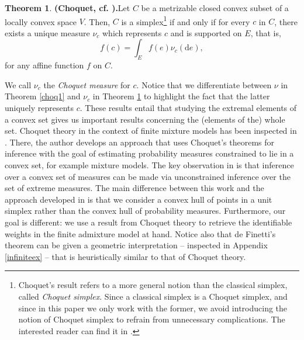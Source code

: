 \documentclass[12pt, reqno]{amsart}
\theoremstyle{definition}
\newtheorem{theorem}{Theorem}%
\begin{document}

\begin{theorem}{\textbf{(Choquet, cf. \cite[Theorem, page 60]{phelps1}).}}\label{choq2}
Let $C$ be a metrizable closed convex subset of a locally convex space $V$. Then, $C$ is a simplex\footnote{Choquet's result refers to a more general notion than the classical simplex, called {\em Choquet simplex}. Since a classical simplex is a Choquet simplex, and since in this paper we only work with the former, we avoid introducing the notion of Choquet simplex to refrain from unnecessary complications. The interested reader can find it in \cite[Chapter 10, page 52]{phelps}.} if and only if for every $c$ in $C$, there exists a unique measure $\nu_c$ which represents $c$ and is supported on $E$, that is, 
$$f(c)=\int_E f(e) \nu_c(\text{d}e),$$
for any affine function $f$ on $C$.
\end{theorem}

We call $\nu_c$ the \textit{Choquet measure} for $c$. Notice that we differentiate between $\nu$ in Theorem \ref{choq1} and $\nu_c$ in Theorem \ref{choq2} to highlight the fact that the latter uniquely represents $c$. These results entail that studying the extremal elements of a convex set gives us important results concerning the (elements of the) whole set. Choquet theory in the context of finite mixture models has been inspected in \cite{hoff}. There, the author develops an approach that uses Choquet's theorems for inference with the goal of estimating probability measures constrained to lie in a convex set, for example mixture models. The key observation in \cite{hoff} is that  inference over a convex set of measures can be made via unconstrained inference over the set of extreme measures. The main difference between this work and the approach developed in \cite{hoff} is that we consider a convex hull of points in a unit simplex rather than the convex hull of probability measures. Furthermore, our goal is different: we use a result from Choquet theory to retrieve the identifiable weights in the finite admixture model at hand. Notice also that de Finetti's theorem \cite{definetti3,definetti1,definetti2} can be given a geometric interpretation -- inspected in Appendix \ref{infiniteex} -- that is heuristically similar to that of Choquet theory.
\end{document}
